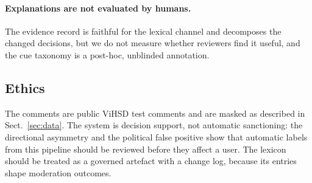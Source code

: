 \paragraph{Explanations are not evaluated by humans.}
The evidence record is faithful for the lexical channel and decomposes the
changed decisions, but we do not measure whether reviewers find it useful, and
the cue taxonomy is a post-hoc, unblinded annotation.

\subsection{Ethics}

\label{sec:ethics}

The comments are public ViHSD test comments and are masked as described in
Sect.~\ref{sec:data}. The system is decision support, not automatic
sanctioning: the directional asymmetry and the political false positive show
that automatic \hate{} labels from this pipeline should be reviewed before they
affect a user. The lexicon should be treated as a governed artefact with a
change log, because its entries shape moderation outcomes.